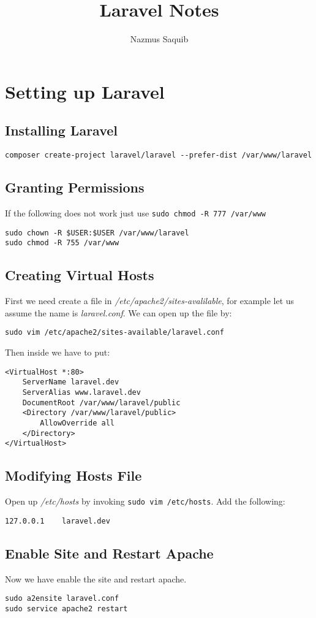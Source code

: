 \documentclass[a4paper, 12pt]{article}
\begin{document}
\title{Laravel Notes}
\author{Nazmus Saquib}

\maketitle
\tableofcontents

\section{Setting up Laravel}
\subsection{Installing Laravel}
\begin{verbatim}
composer create-project laravel/laravel --prefer-dist /var/www/laravel
\end{verbatim}
\subsection{Granting Permissions}
If the following does not work just use \verb|sudo chmod -R 777 /var/www|
\begin{verbatim}
sudo chown -R $USER:$USER /var/www/laravel
sudo chmod -R 755 /var/www
\end{verbatim}
\subsection{Creating Virtual Hosts}
First we need create a file in \emph{/etc/apache2/sites-avalilable}, for example let us assume the name is \emph{laravel.conf}.
We can open up the file by:
\begin{verbatim}
sudo vim /etc/apache2/sites-available/laravel.conf
\end{verbatim}

Then inside we have to put:
\begin{verbatim}
<VirtualHost *:80>
	ServerName laravel.dev
	ServerAlias www.laravel.dev
	DocumentRoot /var/www/laravel/public
	<Directory /var/www/laravel/public>
		AllowOverride all
	</Directory>
</VirtualHost>
\end{verbatim}
\subsection{Modifying Hosts File}
Open up \emph{/etc/hosts} by invoking \verb|sudo vim /etc/hosts|.
Add the following:
\begin{verbatim}
127.0.0.1    laravel.dev
\end{verbatim}
\subsection{Enable Site and Restart Apache}
Now we have enable the site and restart apache.
\begin{verbatim}
sudo a2ensite laravel.conf
sudo service apache2 restart
\end{verbatim}
\end{document}
